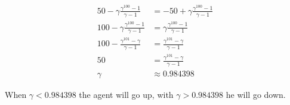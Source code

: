 \documentclass[a4paper]{article}
\begin{document}
\begin{align*}
    50 - \gamma \frac{\gamma^{100} -1}{\gamma -1} &= -50 + \gamma \frac{\gamma^{100} -1}{\gamma -1}\\
    100 -\gamma \frac{\gamma^{100} -1}{\gamma -1} &= \gamma \frac{\gamma^{100} -1}{\gamma -1} \\
    100 -\frac{\gamma^{101} - \gamma}{\gamma -1} &= \frac{\gamma^{101} - \gamma}{\gamma -1}\\
    50 &= \frac{\gamma^{101} - \gamma}{\gamma -1}\\
    \gamma & \approx 0.984398
\end{align*}

When $\gamma < 0.984398$ the agent will go up, with $\gamma > 0.984398$ he will go down.
\end{document}

